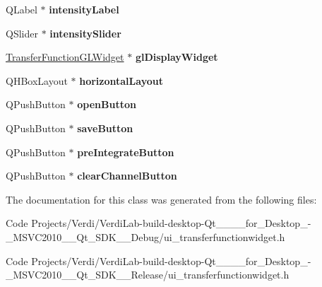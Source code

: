 \begin{DoxyCompactItemize}
\item 
\hypertarget{class_ui___transfer_function_widget_a94c4e2d97d25d107e95bfc37dbad79df}{\-Q\-Label $\ast$ {\bfseries intensity\-Label}}\label{class_ui___transfer_function_widget_a94c4e2d97d25d107e95bfc37dbad79df}

\item 
\hypertarget{class_ui___transfer_function_widget_a00a7865352ffb4d3b82fcfa074987c68}{\-Q\-Slider $\ast$ {\bfseries intensity\-Slider}}\label{class_ui___transfer_function_widget_a00a7865352ffb4d3b82fcfa074987c68}

\item 
\hypertarget{class_ui___transfer_function_widget_a85617bc4767778d52bd00a2db75fa47d}{\hyperlink{class_transfer_function_g_l_widget}{\-Transfer\-Function\-G\-L\-Widget} $\ast$ {\bfseries gl\-Display\-Widget}}\label{class_ui___transfer_function_widget_a85617bc4767778d52bd00a2db75fa47d}

\item 
\hypertarget{class_ui___transfer_function_widget_aa132d92a0605d56b41a349df10866c19}{\-Q\-H\-Box\-Layout $\ast$ {\bfseries horizontal\-Layout}}\label{class_ui___transfer_function_widget_aa132d92a0605d56b41a349df10866c19}

\item 
\hypertarget{class_ui___transfer_function_widget_a45785c8f2b17d772b66d14ec65dcee3d}{\-Q\-Push\-Button $\ast$ {\bfseries open\-Button}}\label{class_ui___transfer_function_widget_a45785c8f2b17d772b66d14ec65dcee3d}

\item 
\hypertarget{class_ui___transfer_function_widget_a7358d877cb627e3c0c426402900bbc93}{\-Q\-Push\-Button $\ast$ {\bfseries save\-Button}}\label{class_ui___transfer_function_widget_a7358d877cb627e3c0c426402900bbc93}

\item 
\hypertarget{class_ui___transfer_function_widget_a2b3ef8e0a1d81f012b512d9bdf3628db}{\-Q\-Push\-Button $\ast$ {\bfseries pre\-Integrate\-Button}}\label{class_ui___transfer_function_widget_a2b3ef8e0a1d81f012b512d9bdf3628db}

\item 
\hypertarget{class_ui___transfer_function_widget_a38f3f15352d8449636ccc1df22631313}{\-Q\-Push\-Button $\ast$ {\bfseries clear\-Channel\-Button}}\label{class_ui___transfer_function_widget_a38f3f15352d8449636ccc1df22631313}

\end{DoxyCompactItemize}


\-The documentation for this class was generated from the following files\-:\begin{DoxyCompactItemize}
\item 
\-Code Projects/\-Verdi/\-Verdi\-Lab-\/build-\/desktop-\/\-Qt\-\_\-\_\-\_\-\_\-for\-\_\-\-Desktop\-\_\--\/\-\_\-\-M\-S\-V\-C2010\-\_\-\-\_\-\-Qt\-\_\-\-S\-D\-K\-\_\-\-\_\-\-Debug/ui\-\_\-transferfunctionwidget.\-h\item 
\-Code Projects/\-Verdi/\-Verdi\-Lab-\/build-\/desktop-\/\-Qt\-\_\-\_\-\_\-\_\-for\-\_\-\-Desktop\-\_\--\/\-\_\-\-M\-S\-V\-C2010\-\_\-\-\_\-\-Qt\-\_\-\-S\-D\-K\-\_\-\-\_\-\-Release/ui\-\_\-transferfunctionwidget.\-h\end{DoxyCompactItemize}
